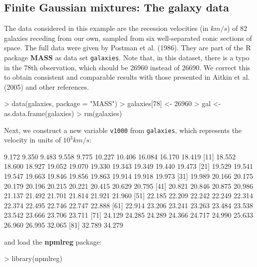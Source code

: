 \documentclass[a4paper]{article}
\begin{document}
\begin{landscape}
\subsection{Finite Gaussian mixtures: The galaxy data}

The data considered in this example are the recession velocities (in $km/s$) of 82 galaxies receding from our own, sampled from six well-separated conic sections of space.
The full data were given by Postman et al. (1986).  They are part of the R package {\bf MASS} as data set {\tt galaxies}.  Note that, in this dataset, 
there is a typo in the 78th observation, which should be 26960 instead of 26690. We correct this to obtain consistent and 
comparable results  with those presented in Aitkin et al. (2005) and other references.

\begin{Schunk}
\begin{Sinput}
> data(galaxies, package = "MASS")
> galaxies[78] <- 26960
> gal <- as.data.frame(galaxies)
> rm(galaxies)
\end{Sinput}
\end{Schunk}

Next, we construct a new  variable {\tt v1000} from {\tt galaxies}, which  represents  
the velocity in units of $10^3km/s$:

\begin{Schunk}
\begin{Soutput}
 [1]  9.172  9.350  9.483  9.558  9.775 10.227 10.406 16.084 16.170 18.419
[11] 18.552 18.600 18.927 19.052 19.070 19.330 19.343 19.349 19.440 19.473
[21] 19.529 19.541 19.547 19.663 19.846 19.856 19.863 19.914 19.918 19.973
[31] 19.989 20.166 20.175 20.179 20.196 20.215 20.221 20.415 20.629 20.795
[41] 20.821 20.846 20.875 20.986 21.137 21.492 21.701 21.814 21.921 21.960
[51] 22.185 22.209 22.242 22.249 22.314 22.374 22.495 22.746 22.747 22.888
[61] 22.914 23.206 23.241 23.263 23.484 23.538 23.542 23.666 23.706 23.711
[71] 24.129 24.285 24.289 24.366 24.717 24.990 25.633 26.960 26.995 32.065
[81] 32.789 34.279
\end{Soutput}
\end{Schunk}

\noindent and load the {\bf npmlreg} package:

\begin{Schunk}
\begin{Sinput}
> library(npmlreg)
\end{Sinput}
\end{Schunk}


\end{landscape}
\end{document}

